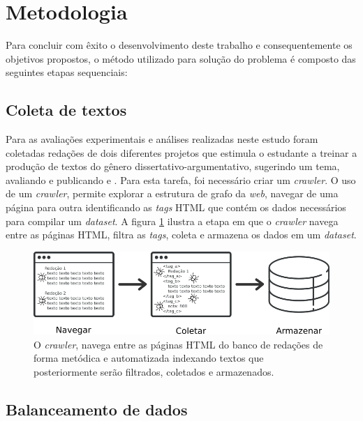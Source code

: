 \section{Metodologia}

Para concluir com êxito o desenvolvimento deste trabalho e consequentemente os 
objetivos propostos, o método utilizado para solução do problema é composto das 
seguintes etapas sequenciais:

\subsection{Coleta de textos}
\label{subsection:coleta_texto}

Para as avaliações experimentais e análises realizadas neste estudo foram 
coletadas redações de dois diferentes projetos que estimula o estudante a 
treinar a produção de textos do gênero dissertativo-argumentativo, sugerindo 
um tema, avaliando e publicando \cite{brasil_escola} e \cite{uol:2017}. Para 
esta tarefa, foi necessário criar um \textit{crawler}. O uso de um 
\textit{crawler}, permite explorar a estrutura de grafo da \textit{web}, 
navegar de uma página para outra identificando as \textit{tags} HTML que contém 
os dados necessários para compilar um \textit{dataset}. A figura 
\ref{figure:metodologia_1} ilustra a etapa em que o \textit{crawler} navega 
entre as páginas HTML, filtra as \textit{tags}, coleta e armazena os dados em 
um \textit{dataset}.

\begin{figure}[H]
\begin{center}
    \includegraphics[scale=0.60]{images/metodologia_1.png}
\end{center}
\caption{O \textit{crawler}, navega entre as páginas HTML do banco de redações 
de forma metódica e automatizada indexando textos que posteriormente serão 
filtrados, coletados e armazenados.}
\label{figure:metodologia_1}
\end{figure}

\subsection{Balanceamento de dados}
\label{subsection:balanceamento_dados}

